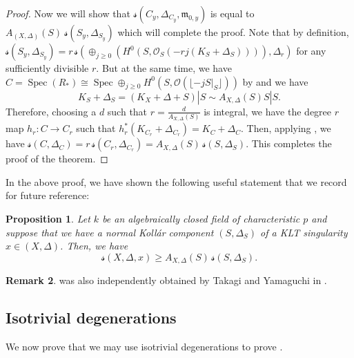 \documentclass[11pt,reqno]{amsart}
\newcommand{\cO}{\mathcal{O}}
\newcommand{\fm}{\mathfrak{m}}
\newcommand{\isom}{\cong}
\DeclareMathOperator{\Spec}{Spec}
\numberwithin{equation}{section}
\newtheorem{prop} {Proposition} [section]
\theoremstyle{definition}
\newtheorem{rem}[prop] {Remark}
\newcommand{\s}{\mathscr{s}}
\begin{document}
\begin{proof}
        Now we will show that $\s(C_y, \Delta_{C_y}, \fm_{0,y})$ is equal to $ A_{(X, \Delta)} (S) \ \s(S_y, \Delta_{S_y})$ which will complete the proof. Note that by definition, $\s(S_y, \Delta_{S_y}) = r \, \s(\oplus_{j \geq 0} (H^ 0 (S, \cO_S (-rj (K_S + \Delta_S)))), \Delta_r)$ for any sufficiently divisible $r$. But at the same time,
        we have $ C= \Spec (R_*) \isom \Spec \oplus _{j \geq 0} H^0 (S, \cO (\lfloor -jS|_S \rfloor) ) $ by \cite[Proposition 2.10]{LiuZhuangSharpnessofTianscriterion} and we have
        \[ K_S + \Delta_S = (K_X + \Delta + S)|S \sim A_{X, \Delta} (S) S |S .\]
        Therefore, choosing a $d$ such that $r = \frac{d}{ A_{X, \Delta} (S)}$ is integral, we have the degree $r$ map $h_r: C \to C_r$ such that $h^* _ r (K_{C_{r}} + \Delta_{C_{r}}) = K_{C} + \Delta_{C}$. Then, applying \cite[Theorem 4.4]{CarvajalRojasSchwedeTuckerFundamentalGroups}, we have $\s(C, \Delta_{C}) = r \, \s(C_{r}, \Delta_{C_{r}}) = A_{X, \Delta} (S) \, \s (S, \Delta_S)$. This completes the proof of the theorem.
\end{proof}

In the above proof, we have shown the following useful statement that we record for future reference:

\begin{prop} \label{Prop:lowerboundKollarcomponent}
    Let $k$ be an algebraically closed field of characteristic $p$ and suppose that we have a normal Koll\'ar component $(S, \Delta_S)$ of a KLT singularity $x \in (X, \Delta)$. Then, we have
    \[  \s(X, \Delta, x) \geq {A_{X, \Delta} (S)} \, \s (S, \Delta_S).  \]
\end{prop}

\begin{rem}
     was also independently obtained by Takagi and Yamaguchi in \cite{TakagiYamaguchiUniformPositivity}.
\end{rem}

\subsection{Isotrivial degenerations}
We now prove that we may use isotrivial degenerations to prove .
\end{document}
